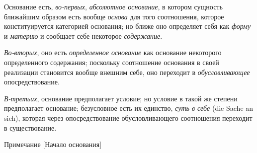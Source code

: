 Основание есть, {\em во-первых},
{\em абсолютное основание}, в котором сущность
ближайшим образом есть вообще {\em основа} для того
соотношения, которое конституируется категорией основания; но ближе оно
определяет себя как {\em форму} и
{\em материю} и сообщает себе некоторое
{\em содержание}.

{\em Во-вторых}, оно есть
{\em определенное основание} как основание некоторого
определенного содержания; поскольку соотношение основания в своей
реализации становится вообще внешним себе, оно переходит в
{\em обусловливающее} опосредствование.

{\em В-третьих}, основание предполагает условие; но
условие в такой же степени предполагает основание; безусловное есть их
единство, {\em суть в себе} (die Sache an sich),
которая через опосредствование обусловливающего соотношения переходит в
существование.

{\centering
Примечание
[Начало основания]
\par}


